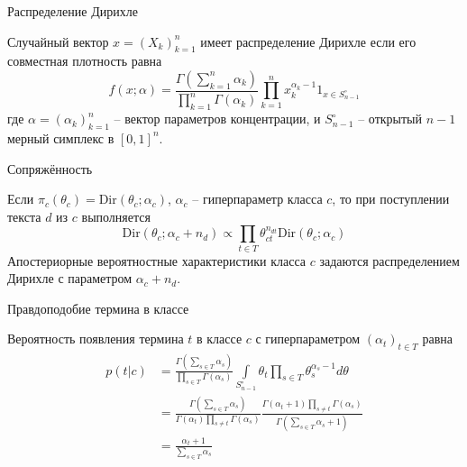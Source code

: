 \documentclass{beamer}
\newcommand{\clo}[1]{\left [ #1 \right ]}
\newcommand{\brac}[1]{\left ( #1 \right )}
\newcommand{\induc}[1]{\left . #1 \right \vert}
\begin{document}
\begin{frame}
  \begin{block}{Распределение Дирихле}

    Случайный вектор $x=\brac{X_k}_{k=1}^n$ имеет распределение Дирихле если его совместная плотность равна
    \[f\brac{x;\alpha} = \frac{\Gamma\brac{\sum_{k=1}^n\alpha_k}}{\prod_{k=1}^n \Gamma(\alpha_k)} \prod_{k=1}^n x_k^{\alpha_k-1} 1_{x\in S_{n-1}^\circ}\]
    где $\alpha = \brac{\alpha_k}_{k=1}^n$ -- вектор параметров концентрации, и $S_{n-1}^\circ$ -- открытый $n-1$ мерный симплекс в $\clo{0,1}^n$.
  \end{block}
  \begin{block}{Сопряжённость}

    Если $\pi_c(\theta_c) = \text{Dir}\brac{\theta_c;\alpha_c}$, $\alpha_c$ -- гиперпараметр класса $c$, то при поступлении текста $d$ из $c$ выполняется
    \[\text{Dir}\brac{\theta_c; \alpha_c+n_d} \propto \prod_{t\in T}\theta_{ct}^{n_{dt}} \text{Dir}\brac{\theta_c; \alpha_c}\]
    Апостериорные вероятностные характеристики класса $c$ задаются распределением Дирихле с параметром $\alpha_c + n_d$.
  \end{block}
\end{frame}

\begin{frame}
  \begin{block}{Правдоподобие термина в классе}

    Вероятность появления термина $t$ в классе $c$ с гиперпараметром $\brac{\alpha_t}_{t\in T}$ равна
    \begin{align*}
      p\brac{\induc{t} c} &= \frac{\Gamma\brac{\sum_{s\in T}\alpha_s}}{\prod_{s\in T} \Gamma(\alpha_s)} \int\limits_{S_{n-1}^\circ} \theta_t \prod_{s\in T} \theta_s^{\alpha_s-1} d\theta \\
      &= \frac{\Gamma\brac{\sum_{s\in T}\alpha_s}}{\Gamma(\alpha_t) \prod_{s\neq t} \Gamma(\alpha_s)} \frac{\Gamma(\alpha_t+1) \prod_{s\neq t} \Gamma(\alpha_s)}{\Gamma\brac{\sum_{s\in T}\alpha_s + 1}}\\
      &= \frac{\alpha_t+1}{\sum_{s\in T}\alpha_s}\\
    \end{align*}
  \end{block}
\end{frame}
\end{document}
